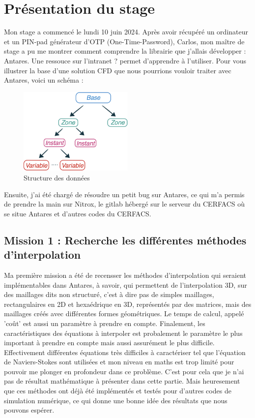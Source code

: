\chapter{Présentation du stage}

Mon stage a commencé le lundi 10 juin 2024. Après avoir récupéré un ordinateur et un PIN-pad générateur d'OTP (One-Time-Password), Carlos, mon maître de stage a pu me montrer comment comprendre la librairie que j'allais développer : Antares. Une ressouce sur l'intranet ? permet d'apprendre à l'utiliser. Pour vous illustrer la base d'une solution CFD que nous pourrions vouloir traiter avec Antares, voici un schéma :

\begin{figure}[ht!]
    \centering
    \includegraphics[width=0.5\textwidth]{images/data_structure_1.png}
    \caption{Structure des données} %
\end{figure}


Ensuite, j'ai été chargé de résoudre un petit bug sur Antares, ce qui m'a permis de prendre la main sur Nitrox, le gitlab hébergé sur le serveur du CERFACS où se situe Antares et d'autres codes du CERFACS.

\section{Mission 1 : Recherche les différentes méthodes d'interpolation}
Ma première mission a été de recensser les méthodes d'interpolation qui seraient implémentables dans Antares, à savoir, qui permettent de l'interpolation 3D, sur des maillages dits non structuré, c'est à dire pas de simples maillages, rectangulaires en 2D et hexaédrique en 3D, représentés par des matrices, mais des maillages créés avec différentes formes géométriques.
Le temps de calcul, appelé 'coût' est aussi un paramètre à prendre en compte.
Finalement, les caractéristiques des équations à interpoler est probalement le paramètre le plus important à prendre en compte mais aussi assurément le plus difficile. Effectivement différentes équations très difficiles à caractériser tel que l'équation de Naviers-Stokes sont utilisées et mon niveau en maths est trop limité pour pouvoir me plonger en profondeur dans ce problème. C'est pour cela que je n'ai pas de résultat mathématique à présenter dans cette partie. Mais heuresement que ces méthodes ont déjà été implémentés et testés pour d'autres codes de simulation numérique, ce qui donne une bonne idée des résultats que nous pouvons espérer.

